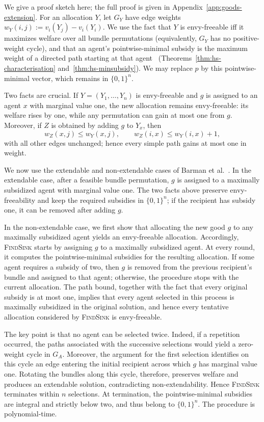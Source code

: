\documentclass[11pt]{article}
\makeatletter
\theoremstyle{plain}
\theoremstyle{plain}
\renewenvironment{proof}[1][\proofname]{\par
  \pushQED{\qed}%
  \normalfont \topsep6\p@\@plus6\p@\relax
  \trivlist
  \item[\hskip\labelsep\bfseries #1\@addpunct{}]\ignorespaces
}{%
  \popQED\endtrivlist\@endpefalse
}
\makeatother
\begin{document}
\begin{proof}
We give a proof sketch here; the full proof is given in Appendix~\ref{app:goods-extension}. For an allocation $Y$, let $G_Y$ have edge weights $w_Y(i,j):=v_i(Y_j)-v_i(Y_i)$. We use the fact that $Y$ is envy-freeable iff it maximizes welfare over all bundle permutations (equivalently, $G_Y$ has no positive-weight cycle), and that an agent's pointwise-minimal subsidy is the maximum weight of a directed path starting at that agent~\cite{HS19} (Theorems~\ref{thm:hs-characterisation} and~\ref{thm:hs-minsubsidy}). We may replace $p$ by this pointwise-minimal vector, which remains in $\{0,1\}^n$.

Two facts are crucial. If $Y=(Y_1,\ldots,Y_n)$ is envy-freeable and $g$ is assigned to an agent $x$ with marginal value one, the new allocation remains envy-freeable: its welfare rises by one, while any permutation can gain at most one from $g$. Moreover, if $Z$ is obtained by adding $g$ to $Y_x$, then
\[
w_Z(x,j)\leq w_Y(x,j),\qquad w_Z(i,x)\leq w_Y(i,x)+1,
\]
with all other edges unchanged; hence every simple path gains at most one in weight.

We now use the extendable and non-extendable cases of Barman et al.~\cite{BKNS22}. In the extendable case, after a feasible bundle permutation, $g$ is assigned to a maximally subsidized agent with marginal value one. The two facts above preserve envy-freeability and keep the required subsidies in $\{0,1\}^n$; if the recipient has subsidy one, it can be removed after adding $g$.

In the non-extendable case, we first show that allocating the new good $g$ to any maximally subsidized agent yields an envy-freeable allocation. Accordingly, \textsc{FindSink} starts by assigning $g$ to a maximally subsidized agent. At every round, it computes the pointwise-minimal subsidies for the resulting allocation. If some agent requires a subsidy of two, then $g$ is removed from the previous recipient's bundle and assigned to that agent; otherwise, the procedure stops with the current allocation. The path bound, together with the fact that every original subsidy is at most one, implies that every agent selected in this process is maximally subsidized in the original solution, and hence every tentative allocation considered by \textsc{FindSink} is envy-freeable.

The key point is that no agent can be selected twice. Indeed, if a repetition occurred, the paths associated with the successive selections would yield a zero-weight cycle in $G_A$. Moreover, the argument for the first selection identifies on this cycle an edge entering the initial recipient across which $g$ has marginal value one. Rotating the bundles along this cycle, therefore, preserves welfare and produces an extendable solution, contradicting non-extendability. Hence \textsc{FindSink} terminates within $n$ selections. At termination, the pointwise-minimal subsidies are integral and strictly below two, and thus belong to $\{0,1\}^n$. The procedure is polynomial-time.
\end{proof}
\end{document}

